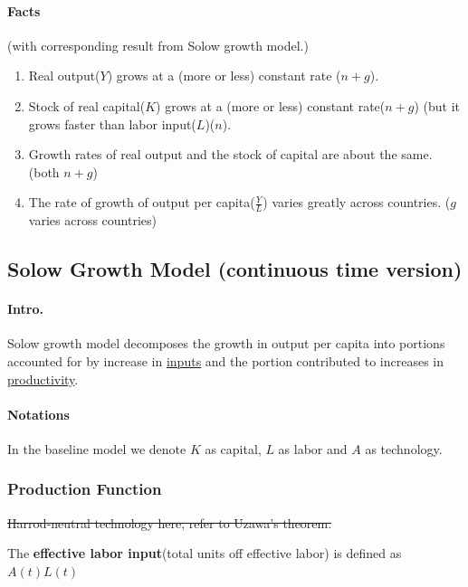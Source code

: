 \documentclass[]{article}
\begin{document}
        \paragraph{Facts}(with corresponding result from Solow growth model.)
        \begin{enumerate}
            \item Real output($Y$) grows at a (more or less) constant rate ($n+g$).
            \item Stock of real capital($K$) grows at a (more or less) constant rate($n+g$) (but it grows faster than labor input($L$)($n$).
            \item Growth rates of real output and the stock of capital are about the same. (both $n+g$)
            \item The rate of growth of output per capita($\frac{Y}{L}$) varies greatly across countries. ($g$ varies across countries)
        \end{enumerate}
        
        \subsection{Solow Growth Model (continuous time version)}
            \paragraph{Intro.} Solow growth model decomposes the growth in output per capita into portions accounted for by increase in \ul{inputs} and the portion contributed to increases in \ul{productivity}.
           
            \paragraph{Notations} In the baseline model we denote $K$ as capital, $L$ as labor and $A$ as technology.
            
        \subsubsection{Production Function}
            \begin{remark}
                \st{Harrod-neutral technology here, refer to Uzawa's theorem.}
            \end{remark}
            \begin{definition}
                The \textbf{effective labor input}(total units off effective labor) is defined as $A(t)L(t)$
            \end{definition}
            
\end{document}
